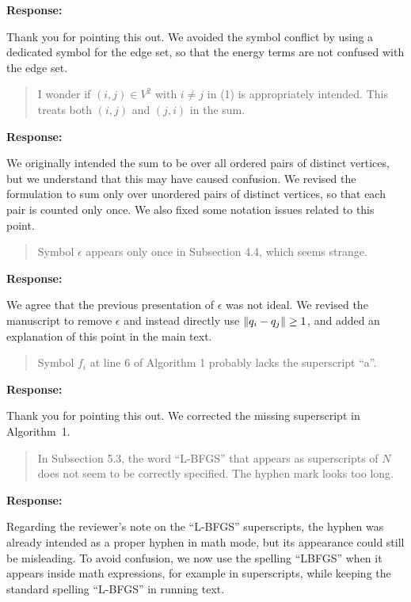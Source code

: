 \documentclass[11pt]{article}
\newcommand{\reviewercomment}[1]{%
  \begin{quote}
  \color{blue}
  #1
  \end{quote}
}
\newenvironment{response}{%
  \noindent\textbf{Response:}%
}{%
  \medskip
}
\begin{document}
\begin{response}
  Thank you for pointing this out.
  We avoided the symbol conflict by using a dedicated symbol for the edge set, so that the energy terms are not confused with the edge set.
\end{response}

\reviewercomment{
  I wonder if $(i, j) \in V^2$ with $i \ne j$ in (1) is appropriately intended.
  This treats both $(i, j)$ and $(j, i)$ in the sum.
}

\begin{response}
  We originally intended the sum to be over all ordered pairs of distinct vertices, but we understand that this may have caused confusion.
  We revised the formulation to sum only over unordered pairs of distinct vertices, so that each pair is counted only once. We also fixed some notation issues related to this point.
\end{response}

\reviewercomment{
  Symbol $\epsilon$ appears only once in Subsection 4.4, which seems strange.
}

\begin{response}
  We agree that the previous presentation of $\epsilon$ was not ideal. We revised the manuscript to remove $\epsilon$ and instead directly use $\norm{q_i - q_j} \geq 1$, and added an explanation of this point in the main text.
\end{response}

\reviewercomment{
  Symbol $f_i$ at line 6 of Algorithm 1 probably lacks the superscript ``a''.
}

\begin{response}
  Thank you for pointing this out.
  We corrected the missing superscript in Algorithm~1.
\end{response}

\reviewercomment{
  In Subsection 5.3, the word ``L-BFGS'' that appears as superscripts of $N$ does not seem to be correctly specified.
  The hyphen mark looks too long.
}

\begin{response}
  Regarding the reviewer's note on the ``L-BFGS'' superscripts, the hyphen was already intended as a proper hyphen in math mode, but its appearance could still be misleading.
  To avoid confusion, we now use the spelling ``LBFGS'' when it appears inside math expressions, for example in superscripts, while keeping the standard spelling ``L-BFGS'' in running text.
\end{response}
\end{document}
